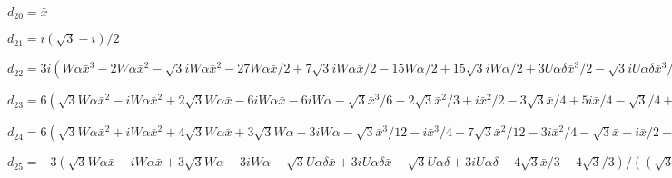 $ d_{20} = \bar{x} $

$ d_{21} = i (\sqrt{3} - i)/2 $

$ d_{22} = 3 i (W \alpha \bar{x}^3 - 2 W \alpha \bar{x}^2 - \sqrt{3} i W \alpha \bar{x}^2 - 27 W \alpha \bar{x}/2 + 7 \sqrt{3} i W \alpha \bar{x}/2 - 15 W \alpha/2 + 15 \sqrt{3} i W \alpha/2 + 3 U \alpha \delta \bar{x}^3/2 - \sqrt{3} i U \alpha \delta \bar{x}^3/2 + 9 U \alpha \delta \bar{x}^2/2 - 7 \sqrt{3} i U \alpha \delta \bar{x}^2/2 + 3 U \alpha \delta \bar{x} - 6 \sqrt{3} i U \alpha \delta \bar{x} - 3 \sqrt{3} i U \alpha \delta + \bar{x}^3 + \sqrt{3} i \bar{x}^3/3 + 5 \bar{x}^2 + \sqrt{3} i \bar{x}^2/3 + 7 \bar{x} - \sqrt{3} i \bar{x} + 3 - \sqrt{3} i)/((\bar{x} + 1) (\sqrt{3} \bar{x}^2 + 3 \sqrt{3} \bar{x} - 3 i \bar{x} + 3 \sqrt{3}/2 - 9 i/2)) $

$ d_{23} = 6 (\sqrt{3} W \alpha \bar{x}^2 - i W \alpha \bar{x}^2 + 2 \sqrt{3} W \alpha \bar{x} - 6 i W \alpha \bar{x} - 6 i W \alpha - \sqrt{3} \bar{x}^3/6 - 2 \sqrt{3} \bar{x}^2/3 + i \bar{x}^2/2 - 3 \sqrt{3} \bar{x}/4 + 5 i \bar{x}/4 - \sqrt{3}/4 + 3 i/4) \bar{x}/((\bar{x} + 1) (\sqrt{3} \bar{x}^2 + 3 \sqrt{3} \bar{x} - 3 i \bar{x} + 3 \sqrt{3}/2 - 9 i/2)) $

$ d_{24} = 6 (\sqrt{3} W \alpha \bar{x}^2 + i W \alpha \bar{x}^2 + 4 \sqrt{3} W \alpha \bar{x} + 3 \sqrt{3} W \alpha - 3 i W \alpha - \sqrt{3} \bar{x}^3/12 - i \bar{x}^3/4 - 7 \sqrt{3} \bar{x}^2/12 - 3 i \bar{x}^2/4 - \sqrt{3} \bar{x} - i \bar{x}/2 - \sqrt{3}/2)/((\bar{x} + 1) (\sqrt{3} \bar{x}^2 + 3 \sqrt{3} \bar{x} - 3 i \bar{x} + 3 \sqrt{3}/2 - 9 i/2)) $

$ d_{25} = -3 (\sqrt{3} W \alpha \bar{x} - i W \alpha \bar{x} + 3 \sqrt{3} W \alpha - 3 i W \alpha - \sqrt{3} U \alpha \delta \bar{x} + 3 i U \alpha \delta \bar{x} - \sqrt{3} U \alpha \delta + 3 i U \alpha \delta - 4 \sqrt{3} \bar{x}/3 - 4 \sqrt{3}/3)/((\sqrt{3} + 3 i) (\bar{x} + 1)) $

